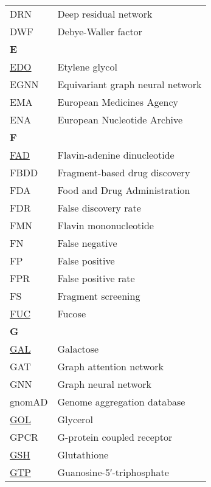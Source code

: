 \begin{longtable}[l]{@{}p{2.5cm}p{12cm}@{}}
\textmd{DRN} & Deep residual network \\
\textmd{DWF} & Debye-Waller factor \\[0.3175cm]
\textbf{\large E} & \\[0.25cm]
\textmd{\href{https://www.ebi.ac.uk/pdbe-srv/pdbechem/chemicalCompound/show/EDO}{EDO}} & Etylene glycol \\
\textmd{EGNN} & Equivariant graph neural network \\
\textmd{EMA} & European Medicines Agency \\
\textmd{ENA} & European Nucleotide Archive \\[0.3175cm]
\textbf{\large F} & \\[0.25cm]
\textmd{\href{https://www.ebi.ac.uk/pdbe-srv/pdbechem/chemicalCompound/show/FAD}{FAD}} & Flavin-adenine dinucleotide \\
\textmd{FBDD} & Fragment-based drug discovery \\
\textmd{FDA} & Food and Drug Administration \\
\textmd{FDR} & False discovery rate \\
\textmd{FMN} & Flavin mononucleotide \\
\textmd{FN} & False negative \\
\textmd{FP} & False positive \\
\textmd{FPR} & False positive rate \\
\textmd{FS} & Fragment screening \\
\textmd{\href{https://www.ebi.ac.uk/pdbe-srv/pdbechem/chemicalCompound/show/FUC}{FUC}} & Fucose \\[0.3175cm]
\textbf{\large G} & \\[0.25cm]
\textmd{\href{https://www.ebi.ac.uk/pdbe-srv/pdbechem/chemicalCompound/show/GAL}{GAL}} & Galactose \\
\textmd{GAT} & Graph attention network \\
\textmd{GNN} & Graph neural network \\
\textmd{gnomAD} & Genome aggregation database \\
\textmd{\href{https://www.ebi.ac.uk/pdbe-srv/pdbechem/chemicalCompound/show/GOL}{GOL}} & Glycerol \\
\textmd{GPCR} & G-protein coupled receptor \\
\textmd{\href{https://www.ebi.ac.uk/pdbe-srv/pdbechem/chemicalCompound/show/GSH}{GSH}} & Glutathione \\
\textmd{\href{https://www.ebi.ac.uk/pdbe-srv/pdbechem/chemicalCompound/show/GTP}{GTP}} & Guanosine-5′-triphosphate \\[0.3175cm]

\end{longtable}

